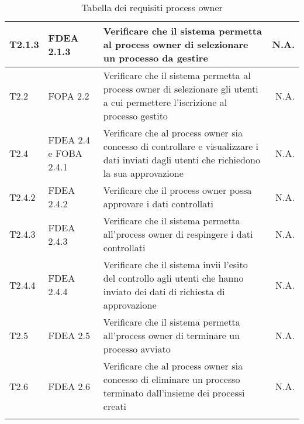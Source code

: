 \begin{longtable}{llXr}
\midrule
T2.1.3&FDEA 2.1.3&Verificare che il sistema permetta al process owner di selezionare un processo da gestire&N.A.\\
\midrule
T2.2&FOPA 2.2&Verificare che il sistema permetta al process owner di selezionare gli utenti a cui permettere l'iscrizione al processo gestito&N.A.\\
\midrule
T2.4&FDEA 2.4 e FOBA 2.4.1&Verificare che al process owner sia concesso di controllare e visualizzare i dati inviati dagli utenti che richiedono la sua approvazione& N.A.\\
\midrule
T2.4.2&FDEA 2.4.2&Verificare che il process owner possa approvare i dati controllati&N.A.\\
\midrule
T2.4.3&FDEA 2.4.3&Verificare che il sistema permetta all'process owner di respingere i dati controllati&N.A.\\
\midrule
T2.4.4&FDEA 2.4.4&Verificare che il sistema invii l'esito del controllo agli utenti che hanno inviato dei dati di richiesta di approvazione&N.A.\\
\midrule
T2.5&FDEA 2.5&Verificare che il sistema permetta all'process owner di terminare un processo avviato&N.A.\\
\midrule
T2.6&FDEA 2.6&Verificare che al process owner sia concesso di eliminare un processo terminato dall'insieme dei processi creati&N.A.\\ 
\bottomrule
\caption{Tabella dei requisiti process owner}
\end{longtable}